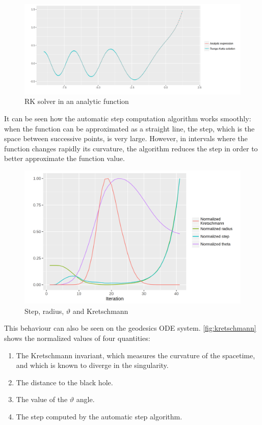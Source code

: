\begin{figure}[bth]
	\myfloatalign
	\includegraphics[width=1.3\linewidth]{gfx/analytic}
	\caption[Solver in an analytic function]{\ac{RK} solver in an analytic function}
	\label{fig:stepsize}
\end{figure}

It can be seen how the automatic step computation algorithm works smoothly: when the function can be approximated as a straight line, the step, which is the space between successive points, is very large. However, in intervals where the function changes rapidly its curvature, the algorithm reduces the step in order to better approximate the function value.

\begin{figure}[bth]
	\myfloatalign
	\includegraphics[width=1.2\linewidth]{gfx/kretschmann}
	\caption[Step, $r$, $\vartheta$ and Kretschmann]{Step, radius, $\vartheta$ and Kretschmann}
	\label{fig:kretschmann}
\end{figure}

This behaviour can also be seen on the geodesics \ac{ODE} system. \autoref{fig:kretschmann} shows the normalized values of four quantities:
\begin{enumerate}
	\item The Kretschmann invariant, which measures the curvature of the spacetime, and which is known to diverge in the singularity.
	\item The distance to the black hole.
	\item The value of the $\vartheta$ angle.
	\item The step computed by the automatic step algorithm.
\end{enumerate}

